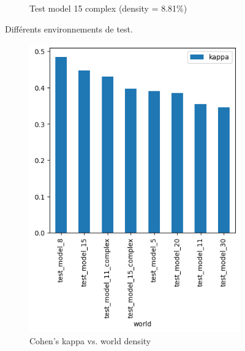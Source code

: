 \documentclass[francais,RandD]{rapportPFE}
\begin{document}
\begin{figure}[h!]
\begin{subfigure}[t]{0.3\linewidth}
					\caption{Test model 15 complex (density = 8.81\%)}
					\label{fig:test_model_15_complex}
			\end{subfigure}
			\caption{Différents environnements de test.}
			\label{fig:test_models}
		\end{figure}

		\begin{figure}[h!]
			\begin{subfigure}[t]{0.49\linewidth}
				\includegraphics[width=\linewidth]{graphics/peinture_au_rouleau-kappa_vs_world.png}
				\caption{Cohen's kappa vs. world density}
				\label{fig:peinture_au_rouleau-kappa_vs_world}
			\end{subfigure}
			\hfill
			\begin{subfigure}[t]{0.49\linewidth}

\end{subfigure}
\end{figure}
\end{document}
